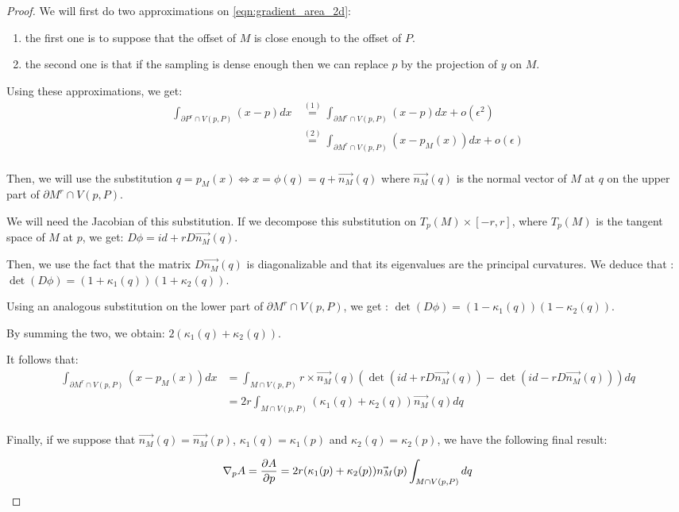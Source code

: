 \begin{proof}
We will first do two approximations on \ref{eqn:gradient_area_2d}:
\begin{enumerate}
    \item the first one is to suppose that the offset of $ M $ is close enough to the offset of $ P $.
    \item the second one is that if the sampling is dense enough then we can replace $ p $
        by the projection of $ y $ on $ M $.
\end{enumerate}

Using these approximations, we get:
\begin{align*}
    \int_{\partial{P^r} \cap V(p, P)} (x - p) dx & \stackrel{(1)}{=} \int_{\partial{M^r} \cap V(p,
        P)} (x - p) dx + o(\epsilon^2) \\
    &\stackrel{(2)}{=} \int_{\partial{M^r} \cap V(p, P)} (x - p_M(x)) dx +
    o(\epsilon) \\
\end{align*}

Then, we will use the substitution $ q = p_M(x) \iff x = \phi(q) = q + \vec{n_M}(q) $
where $ \vec{n_M}(q) $ is the normal vector of $ M $ at $ q $ on the upper part
of $ \partial{M^r} \cap V(p, P) $.

We will need the Jacobian of this substitution. If we decompose this
substitution on $ T_p(M) \times [-r, r] $, where $ T_p(M) $ is the tangent space
of $ M $ at $ p $, we get: $ D \phi = id + r D \vec{n_M}(q) $.

Then, we use the fact that the matrix $ D \vec{n_M}(q) $ is diagonalizable and
that its eigenvalues are the principal curvatures.
We deduce that : $ \det (D \phi) = (1 + \kappa_1(q)) (1 + \kappa_2(q)) $.

Using an analogous substitution on the lower part of $ \partial{M^r} \cap V(p,
P) $, we get : $ \det (D \phi) = (1 - \kappa_1(q)) (1 - \kappa_2(q)) $.

By summing the two, we obtain: $ 2 (\kappa_1(q) + \kappa_2(q)) $.

It follows that:
\begin{align*}
    \int_{\partial{M^r} \cap V(p, P)} (x - p_M(x)) dx &= \int_{M \cap V(p, P)}
    r \times \vec{n_M}(q) ( \det (id + r D \vec{n_M}(q)) - \det (id - r D
    \vec{n_M}(q)) ) dq \\
    &= 2r \int_{M \cap V(p, P)} (\kappa_1(q) + \kappa_2(q)) \vec{n_M}(q) dq \\
\end{align*}

Finally, if we suppose that $ \vec{n_M}(q) = \vec{n_M}(p) $, $ \kappa_1(q) =
\kappa_1(p) $ and $ \kappa_2(q) = \kappa_2(p) $, we have the following final
result:

$$ \nabla_p A = \frac{\partial{A}}{\partial{p}} = 2r (\kappa_1(p) + \kappa_2(p)) \vec{n_M}(p) \int_{M \cap V(p, P)} dq $$

\end{proof}

